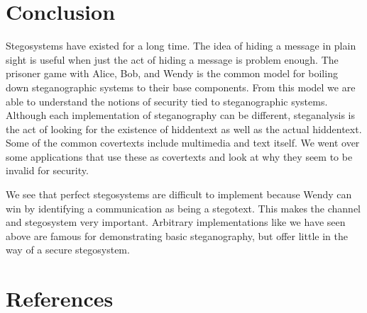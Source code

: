 \documentclass[11pt]{article}
\begin{document}
\section{Conclusion}
Stegosystems have existed for a long time. The idea of hiding a
message in plain sight is useful when just the act of hiding a message
is problem enough. The prisoner game with Alice, Bob, and Wendy is the
common model for boiling down steganographic systems to their base
components. From this model we are able to understand the notions of
security tied to steganographic systems. Although each implementation
of steganography can be different, steganalysis is the act of looking
for the existence of hiddentext as well as the actual hiddentext. Some
of the common covertexts include multimedia and text itself. We went
over some applications that use these as covertexts and look at why
they seem to be invalid for security.

We see that perfect stegosystems are difficult to implement because
Wendy can win by identifying a communication as being a stegotext.
This makes the channel and stegosystem very important. Arbitrary
implementations like we have seen above are famous for demonstrating
basic steganography, but offer little in the way of a secure
stegosystem.

\section{References}
\end{document}

